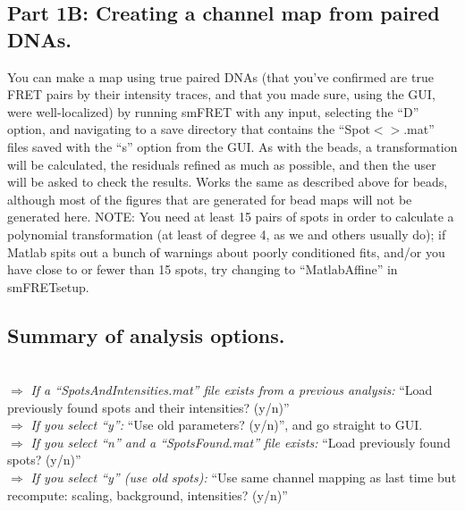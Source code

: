 \documentclass[11pt]{article}
\begin{document}
\subsection{Part 1B: Creating a channel map from paired DNAs.}

You can make a map using true paired DNAs (that you've confirmed are true FRET pairs by their intensity traces, and that you made sure, using the GUI, were well-localized) by running smFRET with any input,  selecting the ``D'' option, and navigating to a save directory that contains the ``Spot$<$$>$.mat'' files saved with the ``s'' option from the GUI.  As with the beads, a transformation will be calculated, the residuals refined as much as possible, and then the user will be asked to check the results.  Works the same as described above for beads, although most of the figures that are generated for bead maps will not be generated here.   NOTE: You need at least 15 pairs of spots in order to calculate a polynomial transformation (at least of degree 4, as we and others usually do); if Matlab spits out a bunch of warnings about poorly conditioned fits, and/or you have close to or fewer than 15 spots, try changing to ``MatlabAffine'' in smFRETsetup.

\subsection{Summary of analysis options.}\label{sec:AnalysisOptions}

\\

\noindent $\Rightarrow$ {\it If a ``SpotsAndIntensities.mat'' file exists from a previous analysis:} ``Load previously found spots and their intensities? (y/n)''  \\

$\Rightarrow$ {\it If you select ``y'':} ``Use old parameters? (y/n)'', and go straight to GUI.\\

$\Rightarrow$ {\it If you select ``n'' and a ``SpotsFound.mat'' file exists:} ``Load previously found spots? (y/n)''  \\

\indent\indent $\Rightarrow$ {\it If you select ``y'' (use old spots):} ``Use same channel mapping as last time but recompute: 
\indent\indent\indent scaling, background, intensities? (y/n)''\\
\end{document}

